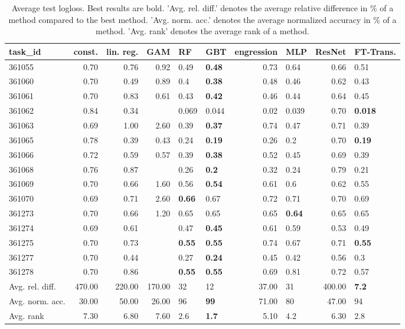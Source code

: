 \begin{table}[ht!]
\centering
\begingroup\footnotesize
\begin{tabular}{lrrrllrlrl}
  \hline
\hline
task\_id & const. & lin. reg. & GAM & RF & GBT & engression & MLP & ResNet & FT-Trans. \\ 
  \hline
361055 & 0.70 & 0.76 & 0.92 & 0.49 & \textbf{0.48} & 0.73 & 0.64 & 0.66 & 0.51 \\ 
  361060 & 0.70 & 0.49 & 0.89 & 0.4 & \textbf{0.38} & 0.48 & 0.46 & 0.62 & 0.43 \\ 
  361061 & 0.70 & 0.83 & 0.61 & 0.43 & \textbf{0.42} & 0.46 & 0.44 & 0.64 & 0.45 \\ 
  361062 & 0.84 & 0.34 &  & 0.069 & 0.044 & 0.02 & 0.039 & 0.70 & \textbf{0.018} \\ 
  361063 & 0.69 & 1.00 & 2.60 & 0.39 & \textbf{0.37} & 0.74 & 0.47 & 0.71 & 0.39 \\ 
  361065 & 0.78 & 0.39 & 0.43 & 0.24 & \textbf{0.19} & 0.26 & 0.2 & 0.70 & \textbf{0.19} \\ 
  361066 & 0.72 & 0.59 & 0.57 & 0.39 & \textbf{0.38} & 0.52 & 0.45 & 0.69 & 0.39 \\ 
  361068 & 0.76 & 0.87 &  & 0.26 & \textbf{0.2} & 0.32 & 0.24 & 0.79 & 0.21 \\ 
  361069 & 0.70 & 0.66 & 1.60 & 0.56 & \textbf{0.54} & 0.61 & 0.6 & 0.62 & 0.55 \\ 
  361070 & 0.69 & 0.71 & 2.60 & \textbf{0.66} & 0.67 & 0.72 & 0.71 & 0.70 & 0.69 \\ 
  361273 & 0.70 & 0.66 & 1.20 & 0.65 & 0.65 & 0.65 & \textbf{0.64} & 0.65 & 0.65 \\ 
  361274 & 0.69 & 0.61 &  & 0.47 & \textbf{0.45} & 0.61 & 0.59 & 0.53 & 0.49 \\ 
  361275 & 0.70 & 0.73 &  & \textbf{0.55} & \textbf{0.55} & 0.74 & 0.67 & 0.71 & \textbf{0.55} \\ 
  361277 & 0.70 & 0.44 &  & 0.27 & \textbf{0.24} & 0.45 & 0.42 & 0.56 & 0.3 \\ 
  361278 & 0.70 & 0.86 &  & \textbf{0.55} & \textbf{0.55} & 0.69 & 0.81 & 0.72 & 0.57 \\ 
   \hline
Avg. rel. diff. & 470.00 & 220.00 & 170.00 & 32 & 12 & 37.00 & 31 & 400.00 & \textbf{7.2} \\ 
  Avg. norm. acc. & 30.00 & 50.00 & 26.00 & 96 & \textbf{99} & 71.00 & 80 & 47.00 & 94 \\ 
  Avg. rank & 7.30 & 6.80 & 7.60 & 2.6 & \textbf{1.7} & 5.10 & 4.2 & 6.30 & 2.8 \\ 
   \hline
\hline
\end{tabular}
\endgroup
\caption{Average test logloss. 
                  Best results are bold. 
                  'Avg. rel. diff.' denotes the average relative difference in \% of a method compared to the best method.
                  'Avg. norm. acc.' denotes the average normalized accuracy in \% of a method.
                  'Avg. rank' denotes the average rank of a method.} 
\label{table_results_Logloss}
\end{table}

